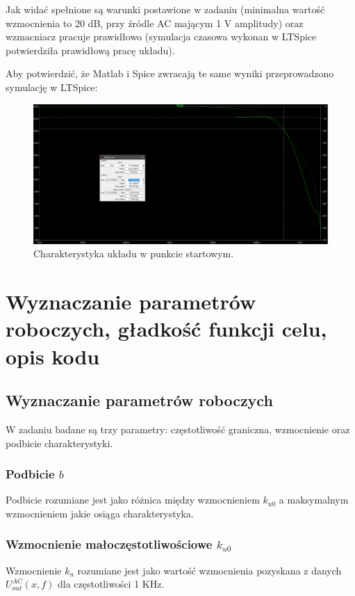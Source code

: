 \documentclass{article}
\begin{document}
Jak widać spełnione są warunki postawione w zadaniu (minimalna wartość wzmocnienia to 20 dB, przy źródle AC mającym 1 V amplitudy) oraz wzmacniacz pracuje prawidłowo (symulacja czasowa wykonan w LTSpice potwierdziła prawidłową pracę układu).
\pagebreak

Aby potwierdzić, że Matlab i Spice zwracają te same wyniki przeprowadzono symulację w LTSpice:
\begin{figure}[h]
	\includegraphics[width=12cm]{graphics/starting_point_spice.png}
	\centering
	\caption{Charakterystyka układu w punkcie startowym.}
\end{figure}




\section{Wyznaczanie parametrów roboczych, gładkość funkcji celu, opis kodu}
\subsection{Wyznaczanie parametrów roboczych}
W zadaniu badane są trzy parametry: częstotliwość graniczna, wzmocnienie oraz podbicie charakterystyki.

\subsubsection*{Podbicie $b$}
Podbicie rozumiane jest jako różnica między wzmocnieniem $k_{u0}$ a maksymalnym wzmocnieniem jakie osiąga charakterystyka.
\subsubsection*{Wzmocnienie małoczęstotliwościowe $k_{u0}$}
Wzmocnienie $k_u$ rozumiane jest jako wartość wzmocnienia pozyskana z danych $U^{AC}_{out}(x,f)$ dla częstotliwości 1 KHz.
\end{document}
